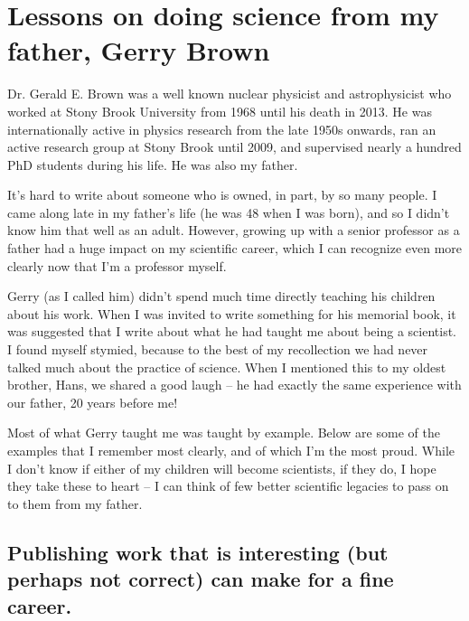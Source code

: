 \documentclass{ws-rv9x6}
\begin{document}
\chapter{Lessons on doing science from my father, Gerry Brown}
\author[C.T. Brown]{C. Titus Brown}
\address{
  Population Health and Reproduction\\
  School of Veterinary Medicine\\
  University of California, Davis\\
  ctbrown@ucdavis.edu}



Dr. Gerald E. Brown was a well known nuclear physicist and
astrophysicist who worked at Stony Brook University from 1968 until
his death in 2013. He was internationally active in physics research
from the late 1950s onwards, ran an active research group at Stony
Brook until 2009, and supervised nearly a hundred PhD students during
his life. He was also my father.

It's hard to write about someone who is owned, in part, by so many
people. I came along late in my father's life (he was 48 when I was
born), and so I didn't know him that well as an adult.  However,
growing up with a senior professor as a father had a huge impact on
my scientific career, which I can recognize even more clearly now
that I'm a professor myself.

Gerry (as I called him) didn't spend much time directly teaching his
children about his work.  When I was invited to write something for
his memorial book, it was suggested that I write about what he had
taught me about being a scientist. I found myself stymied, because to
the best of my recollection we had never talked much about the
practice of science. When I mentioned this to my oldest brother, Hans,
we shared a good laugh  -- he had exactly the same experience with our
father, 20 years before me!

Most of what Gerry taught me was taught by example. Below are some of
the examples that I remember most clearly, and of which I'm the most
proud. While I don't know if either of my children will become
scientists, if they do, I hope they take these to heart -- I can think
of few better scientific legacies to pass on to them from my father.

\section*{Publishing work that is interesting (but perhaps not correct) can make
for a fine career.}
\end{document}

